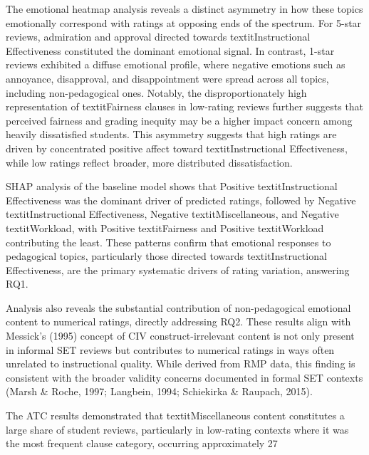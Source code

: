The emotional heatmap analysis reveals a distinct asymmetry in how these topics emotionally correspond with ratings at opposing ends of the spectrum. For 5-star reviews, admiration and approval directed towards textit{Instructional Effectiveness} constituted the dominant emotional signal. In contrast, 1-star reviews exhibited a diffuse emotional profile, where negative emotions such as annoyance, disapproval, and disappointment were spread across all topics, including non-pedagogical ones. Notably, the disproportionately high representation of textit{Fairness} clauses in low-rating reviews further suggests that perceived fairness and grading inequity may be a higher impact concern among heavily dissatisfied students. This asymmetry suggests that high ratings are driven by concentrated positive affect toward textit{Instructional Effectiveness}, while low ratings reflect broader, more distributed dissatisfaction.

SHAP analysis of the baseline model shows that Positive textit{Instructional Effectiveness} was the dominant driver of predicted ratings, followed by Negative textit{Instructional Effectiveness}, Negative textit{Miscellaneous}, and Negative textit{Workload}, with Positive textit{Fairness} and Positive textit{Workload} contributing the least. These patterns confirm that emotional responses to pedagogical topics, particularly those directed towards textit{Instructional Effectiveness}, are the primary systematic drivers of rating variation, answering RQ1.


Analysis also reveals the substantial contribution of non-pedagogical emotional content to numerical ratings, directly addressing RQ2. These results align with Messick’s (1995) concept of CIV construct-irrelevant content is not only present in informal SET reviews but contributes to numerical ratings in ways often unrelated to instructional quality. While derived from RMP data, this finding is consistent with the broader validity concerns documented in formal SET contexts (Marsh & Roche, 1997; Langbein, 1994; Schiekirka & Raupach, 2015). 

The ATC results demonstrated that textit{Miscellaneous} content constitutes a large share of student reviews, particularly in low-rating contexts where it was the most frequent clause category, occurring approximately 27%

